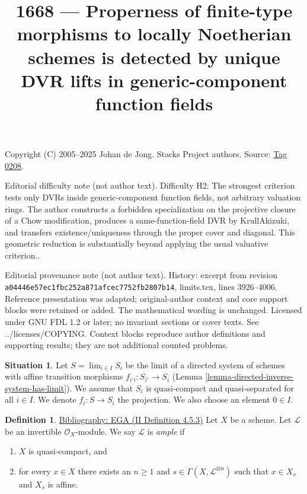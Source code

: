 \documentclass{amsart}
\newenvironment{reference}{\comment}{\endcomment}
\theoremstyle{plain}
\theoremstyle{definition}
\newtheorem{definition}[subsection]{Definition}
\newtheorem{situation}[subsection]{Situation}
\theoremstyle{remark}
\numberwithin{equation}{subsection}
\def\lim{\mathop{\mathrm{lim}}\nolimits}
\begin{document}
\title[Stacks Project, Tag 0208]{1668 --- Properness of finite-type morphisms to locally Noetherian schemes is detected by unique DVR lifts in generic-component function fields}
\maketitle
\noindent Copyright (C) 2005--2025 Johan de Jong. Stacks Project authors. Source: \href{https://stacks.math.columbia.edu/tag/0208}{Tag 0208}.

\noindent Editorial difficulty note (not author text). Difficulty H2: The strongest criterion tests only DVRs inside generic-component function fields, not arbitrary valuation rings. The author constructs a forbidden specialization on the projective closure of a Chow modification, produces a same-function-field DVR by Krull\textendash{}Akizuki, and transfers existence/uniqueness through the proper cover and diagonal. This geometric reduction is substantially beyond applying the usual valuative criterion..

\noindent Editorial provenance note (not author text). History: excerpt from revision \texttt{a0444\allowbreak 6e57e\allowbreak c1fbc\allowbreak 252a8\allowbreak 71afc\allowbreak ec775\allowbreak 2fb28\allowbreak 07b14}, limits.tex, lines 3926--4006. Reference presentation was adapted; original-author context and core support blocks were retained or added. The mathematical wording is unchanged. Licensed under GNU FDL 1.2 or later; no invariant sections or cover texts. See ../licenses/COPYING. Context blocks reproduce author definitions and supporting results; they are not additional counted problems.

\begin{situation}
\label{situation-descent}
Let $S = \lim_{i \in I} S_i$ be the limit of a directed system of schemes
with affine transition morphisms $f_{i'i} : S_{i'} \to S_i$
(Lemma \ref{lemma-directed-inverse-system-has-limit}).
We assume that $S_i$ is quasi-compact and quasi-separated for all $i \in I$.
We denote $f_i : S \to S_i$ the projection.
We also choose an element $0 \in I$.
\end{situation}

\begin{definition}
\label{properties-definition-ample}
\begin{reference}
\href{https://stacks.math.columbia.edu/bibliography}{Bibliography: EGA (II Definition 4.5.3)}
\end{reference}
Let $X$ be a scheme.
Let $\mathcal{L}$ be an invertible $\mathcal{O}_X$-module.
We say $\mathcal{L}$ is {\it ample} if
\begin{enumerate}
\item $X$ is quasi-compact, and
\item for every $x \in X$ there exists an $n \geq 1$
and $s \in \Gamma(X, \mathcal{L}^{\otimes n})$ such
that $x \in X_s$ and $X_s$ is affine.
\end{enumerate}
\end{definition}
\end{document}
